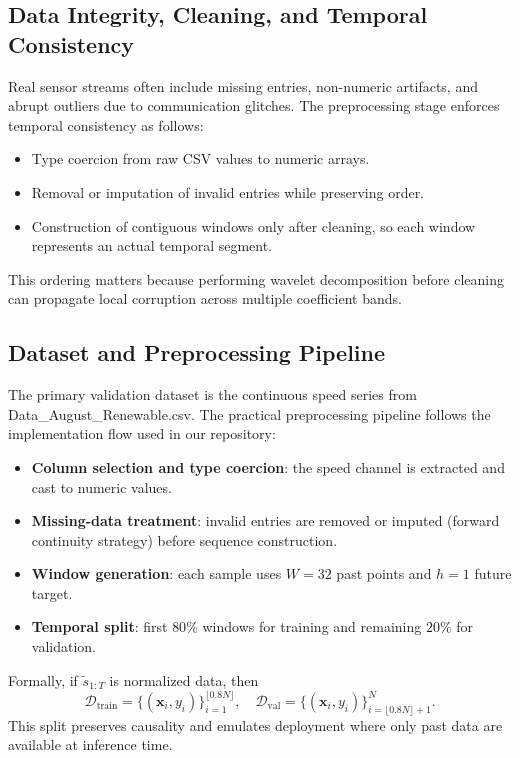 \documentclass[journal]{IEEEtran}
\begin{document}
\subsection{Data Integrity, Cleaning, and Temporal Consistency}
Real sensor streams often include missing entries, non-numeric artifacts, and abrupt outliers due to communication glitches. The preprocessing stage enforces temporal consistency as follows:
\begin{itemize}
  \item Type coercion from raw CSV values to numeric arrays.
  \item Removal or imputation of invalid entries while preserving order.
  \item Construction of contiguous windows only after cleaning, so each window represents an actual temporal segment.
\end{itemize}
This ordering matters because performing wavelet decomposition before cleaning can propagate local corruption across multiple coefficient bands.

\subsection{Dataset and Preprocessing Pipeline}
The primary validation dataset is the continuous speed series from Data\_August\_Renewable.csv. The practical preprocessing pipeline follows the implementation flow used in our repository:
\begin{itemize}
    \item \textbf{Column selection and type coercion}: the speed channel is extracted and cast to numeric values.
    \item \textbf{Missing-data treatment}: invalid entries are removed or imputed (forward continuity strategy) before sequence construction.
    \item \textbf{Window generation}: each sample uses $W=32$ past points and $h=1$ future target.
    \item \textbf{Temporal split}: first $80\%$ windows for training and remaining $20\%$ for validation.
\end{itemize}

Formally, if $\tilde{s}_{1:T}$ is normalized data, then
\begin{equation}
\mathcal{D}_{\text{train}}=\{(\mathbf{x}_i,y_i)\}_{i=1}^{\lfloor 0.8N \rfloor},
\quad
\mathcal{D}_{\text{val}}=\{(\mathbf{x}_i,y_i)\}_{i=\lfloor 0.8N \rfloor+1}^{N}.
\end{equation}
This split preserves causality and emulates deployment where only past data are available at inference time.
\end{document}

